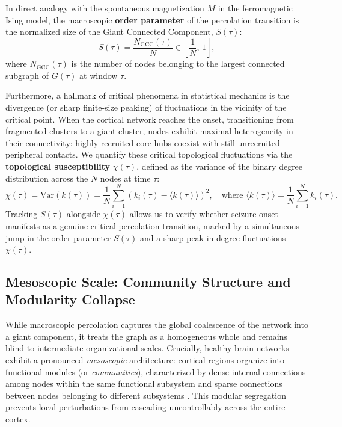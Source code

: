 In direct analogy with the spontaneous magnetization $M$ in the ferromagnetic Ising model, the macroscopic \textbf{order parameter} of the percolation transition is the normalized size of the Giant Connected Component, $S(\tau)$:
\begin{equation}
    S(\tau) = \frac{N_{\text{GCC}}(\tau)}{N} \in \left[\frac{1}{N}, \, 1\right],
    \label{eq:gcc}
\end{equation}
where $N_{\text{GCC}}(\tau)$ is the number of nodes belonging to the largest connected subgraph of $G(\tau)$ at window $\tau$.

Furthermore, a hallmark of critical phenomena in statistical mechanics is the divergence (or sharp finite-size peaking) of fluctuations in the vicinity of the critical point. When the cortical network reaches the onset, transitioning from fragmented clusters to a giant cluster, nodes exhibit maximal heterogeneity in their connectivity: highly recruited core hubs coexist with still-unrecruited peripheral contacts. We quantify these critical topological fluctuations via the \textbf{topological susceptibility} $\chi(\tau)$, defined as the variance of the binary degree distribution across the $N$ nodes at time $\tau$:
\begin{equation}
    \chi(\tau) = \text{Var}\!\left(k(\tau)\right) = \frac{1}{N} \sum_{i=1}^{N} \left(k_i(\tau) - \langle k(\tau) \rangle\right)^2, \quad \text{where } \langle k(\tau) \rangle = \frac{1}{N}\sum_{i=1}^{N} k_i(\tau).
    \label{eq:susceptibility}
\end{equation}
Tracking $S(\tau)$ alongside $\chi(\tau)$ allows us to verify whether seizure onset manifests as a genuine critical percolation transition, marked by a simultaneous jump in the order parameter $S(\tau)$ and a sharp peak in degree fluctuations $\chi(\tau)$.

\subsection{Mesoscopic Scale: Community Structure and Modularity Collapse}
While macroscopic percolation captures the global coalescence of the network into a giant component, it treats the graph as a homogeneous whole and remains blind to intermediate organizational scales. Crucially, healthy brain networks exhibit a pronounced \textit{mesoscopic} architecture: cortical regions organize into functional modules (or \textit{communities}), characterized by dense internal connections among nodes within the same functional subsystem and sparse connections between nodes belonging to different subsystems \cite{bullmore2009complex, newman2018networks}. This modular segregation prevents local perturbations from cascading uncontrollably across the entire cortex.

